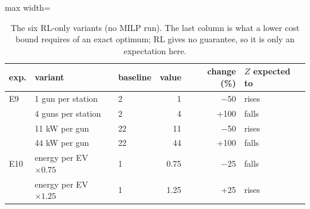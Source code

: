 \begin{table}[H]\centering
\small
\caption{The six RL-only variants (no MILP run). The last column is what a lower cost bound requires of an exact optimum; RL gives no guarantee, so it is only an expectation here.}\label{tab:variantsrl}
\begin{adjustbox}{max width=\textwidth}\begin{tabular}{lllrrl}\toprule
exp. & variant & baseline & value & change (\%) & $Z$ expected to \\ \midrule
E9 & 1 gun per station & 2 & 1 & $-$50 & rises \\
 & 4 guns per station & 2 & 4 & +100 & falls \\
 & 11 kW per gun & 22 & 11 & $-$50 & rises \\
 & 44 kW per gun & 22 & 44 & +100 & falls \\
E10 & energy per EV $\times0.75$ & 1 & 0.75 & $-$25 & falls \\
 & energy per EV $\times1.25$ & 1 & 1.25 & +25 & rises \\
\bottomrule\end{tabular}\end{adjustbox}\end{table}
